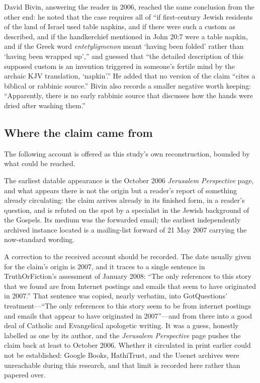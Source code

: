 David Bivin, answering the reader in 2006, reached the same conclusion from the
other end: he noted that the case requires all of ``if first-century Jewish
residents of the land of Israel used table napkins, and if there were such a
custom as described, and if the handkerchief mentioned in John 20:7 were a
table napkin, and if the Greek word \emph{entetyligmenon} meant `having been
folded' rather than `having been wrapped up','' and guessed that ``the detailed
description of this supposed custom is an invention triggered in someone's
fertile mind by the archaic KJV translation, `napkin'.'' He added that no
version of the claim ``cites a biblical or rabbinic source.'' Bivin also
records a smaller negative worth keeping: ``Apparently, there is no early
rabbinic source that discusses how the hands were dried after washing
them.''

\subsection{Where the claim came from}

The following account is offered as this study's own reconstruction, bounded by
what could be reached.

The earliest datable appearance is the October 2006 \emph{Jerusalem
Perspective} page, and what appears there is not the origin but a
reader's report of something already circulating: the claim arrives already in
its finished form, in a reader's question, and is refuted on the spot by a
specialist in the Jewish background of the Gospels. Its medium was the
forwarded email; the earliest independently archived instance located is a
mailing-list forward of 21 May 2007 carrying the now-standard wording.

A correction to the received account should be recorded. The date usually given
for the claim's origin is 2007, and it traces to a single sentence in
TruthOrFiction's assessment of January 2008: ``The only references to this story
that we found are from Internet postings and emails that seem to have originated
in 2007.'' That sentence was copied, nearly verbatim, into GotQuestions'
treatment---``The only references to this story seem to be from internet
postings and emails that appear to have originated in 2007''---and from there
into a good deal of Catholic and Evangelical apologetic writing. It was a guess,
honestly labelled as one by its author, and the \emph{Jerusalem Perspective}
page pushes the claim back at least to October 2006. Whether it circulated in
print earlier could not be established: Google Books, HathiTrust, and the
Usenet archives were unreachable during this research, and that limit is
recorded here rather than papered over.

